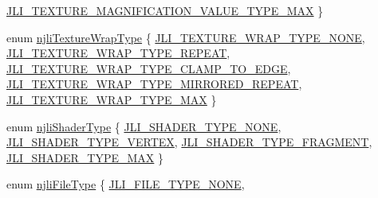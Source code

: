 \begin{DoxyCompactItemize}
\mbox{\hyperlink{namespacenjli_a9fe7a080d946c5be3afc71d834dc7902a4165ad4c110f6ae5c1b66999c225eb86}{J\+L\+I\+\_\+\+T\+E\+X\+T\+U\+R\+E\+\_\+\+M\+A\+G\+N\+I\+F\+I\+C\+A\+T\+I\+O\+N\+\_\+\+V\+A\+L\+U\+E\+\_\+\+T\+Y\+P\+E\+\_\+\+M\+AX}}
 \}
\item 
enum \mbox{\hyperlink{namespacenjli_a6e9496d4850ec7151f04a220e1979b62}{njli\+Texture\+Wrap\+Type}} \{ \newline
\mbox{\hyperlink{namespacenjli_a6e9496d4850ec7151f04a220e1979b62a296f0d1e443927d32fb4a27b46c8beca}{J\+L\+I\+\_\+\+T\+E\+X\+T\+U\+R\+E\+\_\+\+W\+R\+A\+P\+\_\+\+T\+Y\+P\+E\+\_\+\+N\+O\+NE}}, 
\mbox{\hyperlink{namespacenjli_a6e9496d4850ec7151f04a220e1979b62ab58ae1597dfeae81513738000bae9d44}{J\+L\+I\+\_\+\+T\+E\+X\+T\+U\+R\+E\+\_\+\+W\+R\+A\+P\+\_\+\+T\+Y\+P\+E\+\_\+\+R\+E\+P\+E\+AT}}, 
\mbox{\hyperlink{namespacenjli_a6e9496d4850ec7151f04a220e1979b62a9c3a6d8a352dd0e3e03f5f696104c433}{J\+L\+I\+\_\+\+T\+E\+X\+T\+U\+R\+E\+\_\+\+W\+R\+A\+P\+\_\+\+T\+Y\+P\+E\+\_\+\+C\+L\+A\+M\+P\+\_\+\+T\+O\+\_\+\+E\+D\+GE}}, 
\mbox{\hyperlink{namespacenjli_a6e9496d4850ec7151f04a220e1979b62ab31ed901512b1f9b718e4e8f61f0645f}{J\+L\+I\+\_\+\+T\+E\+X\+T\+U\+R\+E\+\_\+\+W\+R\+A\+P\+\_\+\+T\+Y\+P\+E\+\_\+\+M\+I\+R\+R\+O\+R\+E\+D\+\_\+\+R\+E\+P\+E\+AT}}, 
\newline
\mbox{\hyperlink{namespacenjli_a6e9496d4850ec7151f04a220e1979b62a1afaa558d0a910feeca532a934f8f2b1}{J\+L\+I\+\_\+\+T\+E\+X\+T\+U\+R\+E\+\_\+\+W\+R\+A\+P\+\_\+\+T\+Y\+P\+E\+\_\+\+M\+AX}}
 \}
\item 
enum \mbox{\hyperlink{namespacenjli_a8f2b6cfac9213576c34bcf711ac39fbd}{njli\+Shader\+Type}} \{ \mbox{\hyperlink{namespacenjli_a8f2b6cfac9213576c34bcf711ac39fbda359cca691366bd9b00991c1ba19dbbfb}{J\+L\+I\+\_\+\+S\+H\+A\+D\+E\+R\+\_\+\+T\+Y\+P\+E\+\_\+\+N\+O\+NE}}, 
\mbox{\hyperlink{namespacenjli_a8f2b6cfac9213576c34bcf711ac39fbda2b0d4740bfc8bf1f47d35fbede6cc6b4}{J\+L\+I\+\_\+\+S\+H\+A\+D\+E\+R\+\_\+\+T\+Y\+P\+E\+\_\+\+V\+E\+R\+T\+EX}}, 
\mbox{\hyperlink{namespacenjli_a8f2b6cfac9213576c34bcf711ac39fbda446314814389da25bab90e8855a6d3d8}{J\+L\+I\+\_\+\+S\+H\+A\+D\+E\+R\+\_\+\+T\+Y\+P\+E\+\_\+\+F\+R\+A\+G\+M\+E\+NT}}, 
\mbox{\hyperlink{namespacenjli_a8f2b6cfac9213576c34bcf711ac39fbdacb23a15dc0db4135eafa2ae034658564}{J\+L\+I\+\_\+\+S\+H\+A\+D\+E\+R\+\_\+\+T\+Y\+P\+E\+\_\+\+M\+AX}}
 \}
\item 
enum \mbox{\hyperlink{namespacenjli_a3699b2e13e71094f00d7f0141e131106}{njli\+File\+Type}} \{ \newline
\mbox{\hyperlink{namespacenjli_a3699b2e13e71094f00d7f0141e131106addcfb55aa16f2679fc7f33255e300d10}{J\+L\+I\+\_\+\+F\+I\+L\+E\+\_\+\+T\+Y\+P\+E\+\_\+\+N\+O\+NE}}, 

\end{DoxyCompactItemize}
